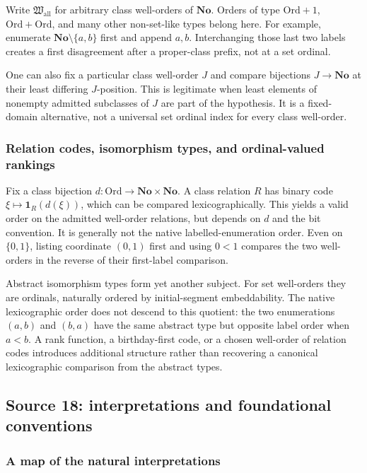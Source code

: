 \documentclass[11pt]{article}
\theoremstyle{definition}
\theoremstyle{remark}
\newcommand{\No}{\mathbf{No}}
\newcommand{\Ord}{\mathrm{Ord}}
\newcommand{\Hall}{\mathfrak W_{\mathrm{all}}}
\begin{document}
Write $\Hall$ for arbitrary class well-orders of $\No$. Orders of type
$\Ord+1$, $\Ord+\Ord$, and many other non-set-like types belong here.
For example, enumerate $\No\setminus\{a,b\}$ first and append $a,b$.
Interchanging those last two labels creates a first disagreement after a
proper-class prefix, not at a set ordinal.

One can also fix a particular class well-order $J$ and compare bijections
$J\to\No$ at their least differing $J$-position. This is legitimate when
least elements of nonempty admitted subclasses of $J$ are part of the
hypothesis. It is a fixed-domain alternative, not a universal set ordinal
index for every class well-order.

\subsubsection{Relation codes, isomorphism types, and ordinal-valued rankings}
Fix a class bijection $d:\Ord\to\No\times\No$. A class relation $R$ has
binary code $\xi\mapsto\mathbf1_R(d(\xi))$, which can be compared
lexicographically. This yields a valid order on the admitted well-order
relations, but depends on $d$ and the bit convention. It is generally not
the native labelled-enumeration order. Even on $\{0,1\}$, listing coordinate
$(0,1)$ first and using $0<1$ compares the two well-orders in the reverse
of their first-label comparison.

Abstract isomorphism types form yet another subject. For set well-orders
they are ordinals, naturally ordered by initial-segment embeddability.
The native lexicographic order does not descend to this quotient: the two
enumerations $(a,b)$ and $(b,a)$ have the same abstract type but opposite
label order when $a<b$. A rank function, a birthday-first code, or a chosen
well-order of relation codes introduces additional structure rather than
recovering a canonical lexicographic comparison from the abstract types.

\subsection{Source 18: interpretations and foundational conventions}
\label{swo:sh:sec:interpretations}

\subsubsection{A map of the natural interpretations}
\end{document}

